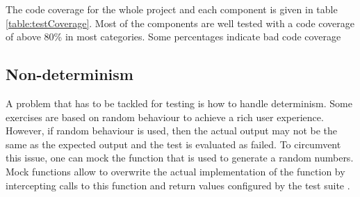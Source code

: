 The code coverage for the whole project and each component is given in table \ref{table:testCoverage}. Most of the components are well tested with a code coverage of above 80\% in most categories. Some percentages indicate bad code coverage 
 
\subsection*{Non-determinism}
A problem that has to be tackled for testing is how to handle determinism. Some exercises are based on random behaviour to achieve a rich user experience. However, if random behaviour is used, then the actual output may not be the same as the expected output and the test is evaluated as failed. To circumvent this issue, one can mock the function that is used to generate a random numbers. Mock functions allow to overwrite the actual implementation of the function by intercepting calls to this function and return values configured by the test suite \cite{Jest}. 

